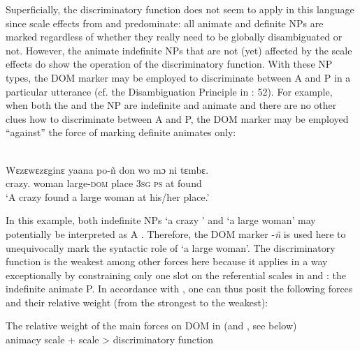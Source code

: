 \documentclass[output=paper]{langsci/langscibook}
\begin{document}
Superficially, the discriminatory function does not seem to apply in this language since scale effects from  and  predominate: all animate and definite NPs are marked regardless of whether they really need to be globally disambiguated or not. However, the animate indefinite NPs that are not (yet) affected by the scale effects do show the operation of the discriminatory function. With these NP types, the DOM marker may be employed to discriminate between A and P in a particular utterance (cf. the Disambiguation Principle in \citealt{Culy1995}: 52). For example, when both the  and the  NP are indefinite and animate and there are no other clues how to discriminate between A and P, the DOM marker may be employed “against” the force of marking definite animates only:

\ea\label{ex:serzant:8}
\\
\gll Wɛzɛwɛzɛginɛ   yaana     po-ñ     don   wo mɔ ni tɛmbɛ.\\
     crazy.  woman    large\textsc{{}-dom}   place  \textsc{3sg} \textsc{ps}  at found\\
\glt ‘A crazy  found a large woman at his/her place.’
\z

\noindent In this example, both indefinite NPs ‘a crazy ’ and ‘a large woman’ may potentially be interpreted as A \citep[53]{Culy1995}. Therefore, the DOM marker -\textit{ñ} is used here to unequivocally mark the syntactic role of ‘a large woman’. The discriminatory function is the weakest among other forces here \citep[53]{Culy1995} because it applies in a way exceptionally by constraining only one slot on the referential scales in  and : the indefinite animate P. In accordance with \citet[51]{Culy1995}, one can thus posit the following forces and their relative weight (from the strongest to the weakest): 

\ea\label{ex:serzant:9}
The relative weight of the main forces on DOM in  (and , see below)\\
animacy scale +  scale > discriminatory function\\
\z
\end{document}
